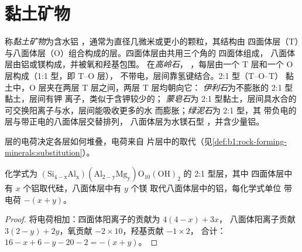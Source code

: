 \section{黏土矿物}\label{sec:b1:weathering-clays:clays}

\begin{definition}\label{def:b1:weathering-clays:clay-mineral}
称\emph{黏土矿物}为含水铝
，通常为直径几微米或更小的颗粒，其结构由
四面体层（T）与八面体层（O）组合构成的层。四面体层由共用三个角的  四面体组成，
八面体层由铝或镁构成，并被氧和羟基包围。
在\emph{高岭石}，
，每层由一个 T 层和一个 O 层构成（1:1 型，即 T--O 层），
不带电，层间靠氢键结合。2:1 型（T--O--T）
黏土中，O 层夹在两层 T 层之间，两层 T 层均朝向它：
\emph{伊利石}为不膨胀的 2:1 型黏土，层间有钾
离子，类似于含钾较少的；
\emph{蒙皂石}为 2:1 型黏土，层间具水合的
可交换阳离子与水，层间能吸收更多的水
而膨胀；\emph{绿泥石}为 2:1 型，其
带负电的层与带正电的八面体层交替排列，
八面体层为水镁石型 ，并含少量铝。
\end{definition}

层的电荷决定各层如何堆叠，电荷来自
片层中的取代（见\cref{def:b1:rock-forming-minerals:substitution}）。

\begin{proposition}[2:1 型层的电荷]\label{prop:b1:weathering-clays:layer-charge}
化学式为 $\mathrm{(Si_{4-x}Al_x)(Al_{2-y}Mg_y)O_{10}(OH)_2}$ 的 2:1 型层，其中
四面体层中有 $x$ 个铝取代硅，八面体层中有 $y$ 个镁
取代八面体层中的铝，每化学式单位
带电荷 $-(x + y)$。
\end{proposition}

\begin{proof}
将电荷相加：四面体阳离子的贡献为 $4(4 - x) + 3x$，
八面体阳离子贡献 $3(2 - y) + 2y$，氧贡献 $-2\times10$，羟基贡献 $-1\times2$，
合计：$16 - x + 6 - y - 20 - 2 = -(x + y)$。
\end{proof}

